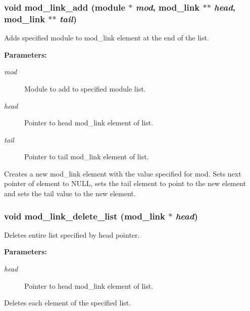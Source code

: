 \subsubsection{\setlength{\rightskip}{0pt plus 5cm}void mod\_\-link\_\-add ({\bf module} $\ast$ {\em mod}, {\bf mod\_\-link} $\ast$$\ast$ {\em head}, {\bf mod\_\-link} $\ast$$\ast$ {\em tail})}\label{link_8h_a5}


Adds specified module to mod\_\-link element at the end of the list.

\begin{Desc}
\item[{\bf Parameters: }]\par
\begin{description}
\item[
{\em mod}]Module to add to specified module list. \item[
{\em head}]Pointer to head mod\_\-link element of list. \item[
{\em tail}]Pointer to tail mod\_\-link element of list.

\end{description}
\end{Desc}
Creates a new mod\_\-link element with the value specified for mod. Sets next pointer of element to NULL, sets the tail element to point to the new element and sets the tail value to the new element. 
\subsubsection{\setlength{\rightskip}{0pt plus 5cm}void mod\_\-link\_\-delete\_\-list ({\bf mod\_\-link} $\ast$ {\em head})}\label{link_8h_a22}


Deletes entire list specified by head pointer.

\begin{Desc}
\item[{\bf Parameters: }]\par
\begin{description}
\item[
{\em head}]Pointer to head mod\_\-link element of list.

\end{description}
\end{Desc}
Deletes each element of the specified list. 
